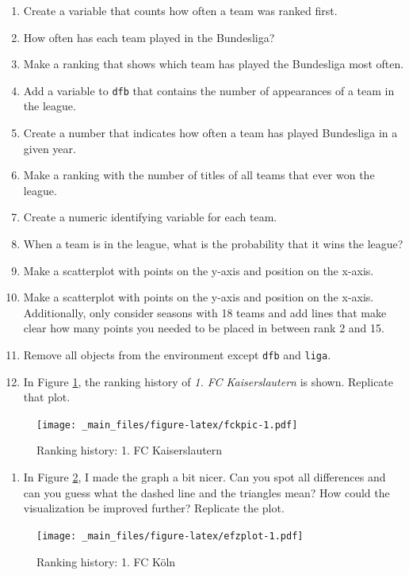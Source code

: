 \documentclass[
  12pt,
  oneside]{book}
\providecommand{\tightlist}{%
  \setlength{\itemsep}{0pt}\setlength{\parskip}{0pt}}
\begin{document}
\begin{enumerate}
\item
  Create a variable that counts how often a team was ranked first.
\item
  How often has each team played in the Bundesliga?
\item
  Make a ranking that shows which team has played the Bundesliga most often.
\item
  Add a variable to \texttt{dfb} that contains the number of appearances of a team in the league.
\item
  Create a number that indicates how often a team has played Bundesliga in a given year.
\item
  Make a ranking with the number of titles of all teams that ever won the league.
\item
  Create a numeric identifying variable for each team.
\item
  When a team is in the league, what is the probability that it wins the league?
\item
  Make a scatterplot with points on the y-axis and position on the x-axis.
\item
  Make a scatterplot with points on the y-axis and position on the x-axis. Additionally, only consider seasons with 18 teams and add lines that make clear how many points you needed to be placed in between rank 2 and 15.
\item
  Remove all objects from the environment except \texttt{dfb} and \texttt{liga}.
\item
  In Figure \ref{fig:fckpic}, the ranking history of \emph{1. FC Kaiserslautern} is shown. Replicate that plot.
\end{enumerate}

\begin{figure}
\centering
\texttt{[image: \_main\_files/figure-latex/fckpic-1.pdf]}
\caption{\label{fig:fckpic}Ranking history: 1. FC Kaiserslautern}
\end{figure}

\begin{enumerate}
\def\labelenumi{\arabic{enumi}.}
\setcounter{enumi}{33}
\tightlist
\item
  In Figure \ref{fig:efzplot}, I made the graph a bit nicer. Can you spot all differences and can you guess what the dashed line and the triangles mean? How could the visualization be improved further? Replicate the plot.
\end{enumerate}

\begin{figure}
\centering
\texttt{[image: \_main\_files/figure-latex/efzplot-1.pdf]}
\caption{\label{fig:efzplot}Ranking history: 1. FC Köln}
\end{figure}
\end{document}
